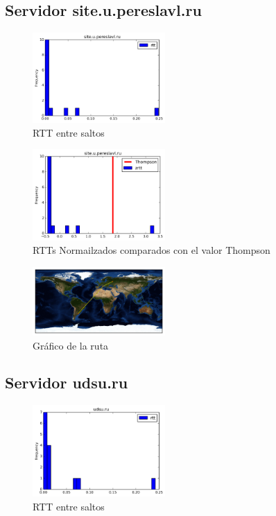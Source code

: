 \subsection{Servidor site.u.pereslavl.ru}
\begin{figure}[H]
  \centering
    \includegraphics[width=0.45\textwidth]{histogramas_rtt/site-u-pereslavl-ru.png}
  \caption{RTT entre saltos}
  \label{entropia-s}
\end{figure}

\begin{figure}[H]
  \centering
    \includegraphics[width=0.45\textwidth]{histogramas_thompson/site-u-pereslavl-ru.png}
  \caption{RTTs Normailzados comparados con el valor Thompson}
  \label{entropia-s}
\end{figure}

\begin{figure}[H]
  \centering
    \includegraphics[width=0.45\textwidth]{grafico-rutas/site-u-pereslavl-ru.png}
  \caption{Gráfico de la ruta}
  \label{entropia-s}
\end{figure}




\subsection{Servidor udsu.ru}
\begin{figure}[H]
  \centering
    \includegraphics[width=0.45\textwidth]{histogramas_rtt/udsu-ru.png}
  \caption{RTT entre saltos}
  \label{entropia-s}
\end{figure}

